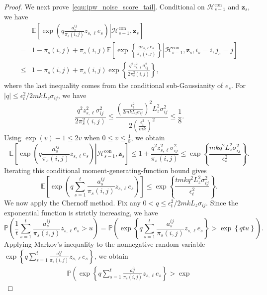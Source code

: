 \documentclass[10pt,a4paper]{amsart}
\begin{document}
\begin{proof}
We next prove~\eqref{equ:ipw_noise_score_tail}. Conditional on
$\mathcal H_{s-1}^{\mathrm{con}}$ and $\bm z_s$, we have
\begin{align*}
&
\mathbb E
\left[
\left.
\exp
\left(
q\frac{ a_s^{ij} }{ \pi_s(i,j) } z_{s,\ell} e_s
\right)
\right|
\mathcal H_{s-1}^{\mathrm{con}},
\bm z_s
\right] \\
=&
1-\pi_s(i,j)+ \pi_s(i,j)
\mathbb E
\left[
\left.
\exp
\left\{
\frac{
qz_{s,\ell}e_s}{\pi_s(i,j)}
\right\}
\right|
\mathcal H_{s-1}^{\mathrm{con}},
\bm z_s,i_s=i,j_s=j
\right] \\
\le &
1-\pi_s(i,j)+\pi_s(i,j)
\exp
\left\{
\frac{q^2z_{s,\ell}^2\sigma_{ij}^2}{2\pi_s^2(i,j)}
\right\},
\end{align*}
where the last inequality comes from the conditional sub-Gaussianity of $e_s$. 
For $|q| \le {\epsilon_t^2}/{2mkL_z\sigma_{ij}}$,
we have
\[
\frac{q^2z_{s,\ell}^2\sigma_{ij}^2}{2\pi_s^2(i,j)}
\le
\frac{\left(\frac{\epsilon_t^2}{2mkL_z\sigma_{ij}}\right)^2L_z^2\sigma_{ij}^2}{2\left(\frac{\epsilon_t^2}{mk} \right)^2}
\le \frac18.
\]
Using $\exp(v)-1 \le 2v$ when $0\le v\le\frac18$, we obtain
\begin{equation*}
\mathbb E
\left[
\left.
\exp
\left(
q\frac{ a_s^{ij} }{ \pi_s(i,j) } z_{s,\ell} e_s
\right)
\right|
\mathcal H_{s-1}^{\mathrm{con}},
\bm z_s
\right]
\le
1+\frac{q^2z_{s,\ell}^2\sigma_{ij}^2}{\pi_s(i,j)}
\le
\exp
\left\{
\frac{mk q^2L_z^2\sigma_{ij}^2}{\epsilon_s^2}
\right\}.
\end{equation*}
Iterating this conditional moment-generating-function bound gives
\[
\mathbb E
\left[
\exp
\left(
q\sum_{s=1}^t
\frac{ a_s^{ij} }{ \pi_s(i,j) } z_{s,\ell} e_s
\right)
\right]
\le
\exp
\left\{
\frac{tmkq^2L_z^2\sigma_{ij}^2}{\epsilon_t^2}
\right\}.
\]
We now apply the Chernoff method. Fix any $0<q\le {\epsilon_t^2}/{2mkL_z\sigma_{ij}}$.
Since the exponential function is strictly increasing, we have
\begin{equation*}
\mathbb P
\left(
\frac{1}{t}
\sum_{s=1}^t
\frac{ a_s^{ij} }{ \pi_s(i,j) } z_{s,\ell} e_s
>u\right)=
\mathbb P
\left(
\exp
\left\{q
\sum_{s=1}^t
\frac{ a_s^{ij} }{ \pi_s(i,j) } z_{s,\ell} e_s
\right\}
>
\exp\left\{qtu\right\}\right).
\end{equation*}
Applying Markov's inequality to the nonnegative random variable $\exp
\left\{
q\sum_{s=1}^t
\frac{ a_s^{ij} }{ \pi_s(i,j) } z_{s,\ell} e_s
\right\}$,
we obtain
\begin{align*}
\mathbb P
\left(
\exp
\left\{
q\sum_{s=1}^t
\frac{ a_s^{ij} }{ \pi_s(i,j) } z_{s,\ell} e_s
\right\}
>
\exp

\end{align*}
\end{proof}
\end{document}
